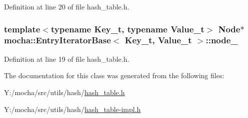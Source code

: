 Definition at line 20 of file hash\_\-table.h.

\hypertarget{classmocha_1_1_entry_iterator_base_a6cd7e41a0a9e198c6ef5bcf745f0a89a}{
\subsubsection[{node\_\-}]{\setlength{\rightskip}{0pt plus 5cm}template$<$typename Key\_\-t, typename Value\_\-t$>$ {\bf Node}$\ast$ {\bf mocha::EntryIteratorBase}$<$ Key\_\-t, Value\_\-t $>$::{\bf node\_\-}}}
\label{classmocha_1_1_entry_iterator_base_a6cd7e41a0a9e198c6ef5bcf745f0a89a}


Definition at line 19 of file hash\_\-table.h.



The documentation for this class was generated from the following files:\begin{DoxyCompactItemize}
\item 
Y:/mocha/src/utils/hash/\hyperlink{hash__table_8h}{hash\_\-table.h}\item 
Y:/mocha/src/utils/hash/\hyperlink{hash__table-impl_8h}{hash\_\-table-\/impl.h}\end{DoxyCompactItemize}

